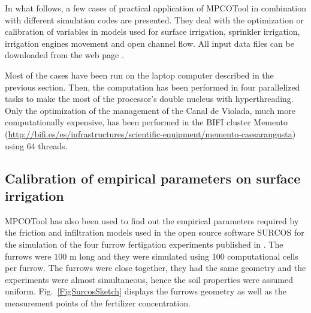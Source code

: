 \documentclass[review,authoryear]{elsarticle}
\begin{document}
In what follows, a few cases of practical application of MPCOTool in combination with
different simulation codes are presented. They deal with the optimization
or calibration 
of variables in models used for surface irrigation, sprinkler irrigation, irrigation engines movement and open channel flow. All input data files can be downloaded from the web page \citep{MPCOToolGit}.

Most of the cases have been run on the laptop computer described in the previous
section. Then, the computation has been performed in four parallelized tasks to
make the most of the processor's double nucleus with hyperthreading.
Only the optimization of the management of the Canal de Violada, much more computationally expensive, has been performed in the BIFI cluster Memento
(\url{http://bifi.es/es/infrastructures/scientific-equipment/memento-caesaraugusta}) using 64 threads.

\subsection{Calibration of empirical parameters on surface irrigation}

MPCOTool has also been used to find out the empirical parameters required by the friction and infiltration
models used in the open source software SURCOS \citep{Surcos,SurcosGit,JaviSurcos3} for the simulation of the four furrow fertigation experiments published in \citet{JaviSurcos2}. The furrows were $100$ m long and they were simulated using 100 computational cells per furrow. The furrows were close together, they had the same geometry and the experiments were almost simultaneous, hence the soil properties were assumed uniform. 
Fig.~\ref{FigSurcosSketch} displays the furrows geometry as well as the measurement points of the fertilizer 
concentration. 
\end{document}
